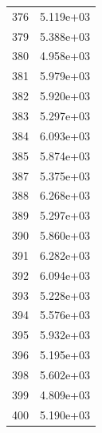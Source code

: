 \documentclass[12pt]{article}
\begin{document}
\begin{longtable}{@{}cc@{}}
376 & 5.119e+03 \\
379 & 5.388e+03 \\
380 & 4.958e+03 \\
381 & 5.979e+03 \\
382 & 5.920e+03 \\
383 & 5.297e+03 \\
384 & 6.093e+03 \\
385 & 5.874e+03 \\
387 & 5.375e+03 \\
388 & 6.268e+03 \\
389 & 5.297e+03 \\
390 & 5.860e+03 \\
391 & 6.282e+03 \\
392 & 6.094e+03 \\
393 & 5.228e+03 \\
394 & 5.576e+03 \\
395 & 5.932e+03 \\
396 & 5.195e+03 \\
398 & 5.602e+03 \\
399 & 4.809e+03 \\
400 & 5.190e+03 \\

\bottomrule
\end{longtable}
\end{document}
